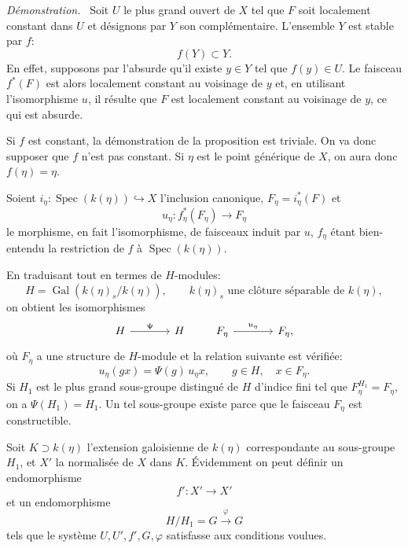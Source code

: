 \documentclass[11pt]{article}
\newenvironment{prooftext}[1][Proof]{\par\noindent\emph{#1.}\ }{\par\medskip}
\DeclareMathOperator{\Spec}{Spec}
\providecommand{\Gal}{\operatorname{Gal}}
\providecommand{\Spec}{\operatorname{Spec}}
\providecommand{\Spec}{\operatorname{Spec}}
\providecommand{\Spec}{\operatorname{Spec}}
\begin{document}
\begin{prooftext}[Démonstration]
Soit $U$ le plus grand ouvert de $X$ tel que $F$ soit localement constant dans $U$ et désignons par $Y$ son complémentaire. L'ensemble $Y$ est stable par $f$:
\[
f(Y)\subset Y.
\]
En effet, supposons par l'absurde qu'il existe $y\in Y$ tel que $f(y)\in U$. Le faisceau $f^*(F)$ est alors localement constant au voisinage de $y$ et, en utilisant l'isomorphisme $u$, il résulte que $F$ est localement constant au voisinage de $y$, ce qui est absurde.

Si $f$ est constant, la démonstration de la proposition est triviale. On va donc supposer que $f$ n'est pas constant. Si $\eta$ est le point générique de $X$, on aura donc $f(\eta)=\eta$.

Soient $i_\eta:\Spec(k(\eta))\hookrightarrow X$ l'inclusion canonique, $F_\eta=i_\eta^*(F)$ et
\[
u_\eta:f_\eta^*(F_\eta)\longrightarrow F_\eta
\]
le morphisme, en fait l'isomorphisme, de faisceaux induit par $u$, $f_\eta$ étant bien-entendu la restriction de $f$ à $\Spec(k(\eta))$.

En traduisant tout en termes de $H$-modules:
\[
H=\Gal(k(\eta)_s/k(\eta)),\qquad k(\eta)_s\text{ une clôture séparable de }k(\eta),
\]
on obtient les isomorphismes
\[
\begin{tikzcd}[column sep=large]
H \arrow[r,"\Psi"] & H
\end{tikzcd}
\qquad
\begin{tikzcd}[column sep=large]
F_\eta \arrow[r,"u_\eta"] & F_\eta,
\end{tikzcd}
\]
où $F_\eta$ a une structure de $H$-module et la relation suivante est vérifiée:
\[
u_\eta(gx)=\Psi(g)\,u_\eta x,
\qquad g\in H,
\quad x\in F_\eta.
\]
Si $H_1$ est le plus grand sous-groupe distingué de $H$ d'indice fini tel que $F_\eta^{H_1}=F_\eta$, on a $\Psi(H_1)=H_1$. Un tel sous-groupe existe parce que le faisceau $F_\eta$ est constructible.

Soit $K\supset k(\eta)$ l'extension galoisienne de $k(\eta)$ correspondante au sous-groupe $H_1$, et $X'$ la normalisée de $X$ dans $K$. Évidemment on peut définir un endomorphisme
\[
f':X'\longrightarrow X'
\]
et un endomorphisme
\[
H/H_1=G\xrightarrow{\varphi}G
\]
tels que le système $U,U',f',G,\varphi$ satisfasse aux conditions voulues.
\end{prooftext}
\end{document}
